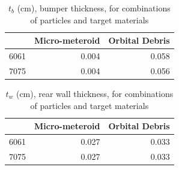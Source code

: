 \documentclass[onecolumn,10pt]{jhwhw}
\begin{document}
\begin{table}[h]
\begin{center}
\begin{tabular}{r|rr}
\toprule
      &   Micro-meteroid &   Orbital Debris \\
\midrule
 6061 &            0.004 &            0.058 \\
 7075 &            0.004 &            0.056 \\
\bottomrule
\end{tabular}
\end{center}
\caption{$t_b$ (cm), bumper thickness, for combinations of particles and target materials}
\end{table}

\begin{table}[h]
\begin{center}
\begin{tabular}{r|rr}
\toprule
      &   Micro-meteroid &   Orbital Debris \\
\midrule
 6061 &            0.027 &            0.033 \\
 7075 &            0.027 &            0.033 \\
\bottomrule
\end{tabular}
\end{center}
\caption{$t_w$ (cm), rear wall thickness, for combinations of particles and target materials}
\end{table}
\end{document}
